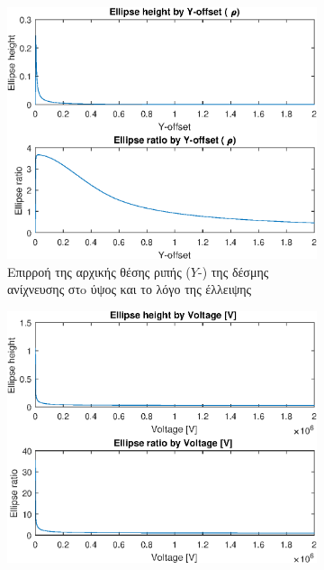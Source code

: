 \begin{figure}[tph]
\begin{subfigure}{0.47\textwidth}
		\label{fig:EBS-variables-length}
	\end{subfigure}
	\par\bigskip
	\begin{subfigure}{0.47\textwidth}
		\includegraphics[width=\linewidth]{figures/MATLAB-variable-analysis/EBS-variables-rho}
		\centering
		\caption[Επιρροή της αρχικής θέσης ριπής της δέσμης ανίχνευσης στην ύψος και το λόγο της έλλειψης]{Επιρροή της αρχικής θέσης ριπής ($Y$-) της δέσμης ανίχνευσης στo ύψος και το λόγο της έλλειψης}
		\label{fig:EBS-variables-rho}
	\end{subfigure}
	\hfill
	\begin{subfigure}{0.47\textwidth}
		\includegraphics[width=\linewidth]{figures/MATLAB-variable-analysis/EBS-variables-voltage-linear}

\end{subfigure}
\end{figure}
